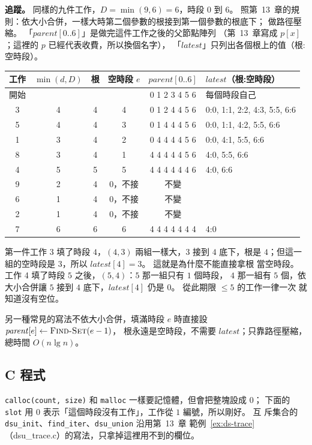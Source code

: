 \textbf{追蹤。} 同樣的九件工作，$D = \min(9, 6) = 6$，時段 $0$ 到 $6$。 
照第~13~章的規則：依大小合併，一樣大時第二個參數的根接到第一個參數的根底下；
 做路徑壓縮。 「$\mathit{parent}[0..6]$」是做完這件工作之後的父節點陣列
（第~13~章寫成 $p[x]$；這裡的 $p$ 已經代表收費，所以換個名字），
「$\mathit{latest}$」只列出各個根上的值（根:空時段）。

\begin{center}
\small
\begin{tabular}{cccccl}
\toprule
工作 & $\min(d, D)$ & 根 & 空時段 $e$ & $\mathit{parent}[0..6]$ & $\mathit{latest}$（根:空時段） \\
\midrule
開始 & & & & 0 1 2 3 4 5 6 & 每個時段自己 \\
3 & 4 & 4 & 4 & 0 1 2 4 4 5 6 & 0:0, 1:1, 2:2, 4:3, 5:5, 6:6 \\
5 & 4 & 4 & 3 & 0 1 4 4 4 5 6 & 0:0, 1:1, 4:2, 5:5, 6:6 \\
1 & 3 & 4 & 2 & 0 4 4 4 4 5 6 & 0:0, 4:1, 5:5, 6:6 \\
8 & 3 & 4 & 1 & 4 4 4 4 4 5 6 & 4:0, 5:5, 6:6 \\
4 & 5 & 5 & 5 & 4 4 4 4 4 4 6 & 4:0, 6:6 \\
9 & 2 & 4 & 0，不接 & 不變 & \\
6 & 1 & 4 & 0，不接 & 不變 & \\
2 & 1 & 4 & 0，不接 & 不變 & \\
7 & 6 & 6 & 6 & 4 4 4 4 4 4 4 & 4:0 \\
\bottomrule
\end{tabular}
\end{center}

第一件工作 3 填了時段 $4$，$(4, 3)$ 兩組一樣大，$3$ 接到 $4$ 底下，根是
$4$；但這一組的空時段是 $3$，所以 $\mathit{latest}[4] = 3$。 這就是為什麼不能直接拿根
當空時段。 工作 4 填了時段 $5$ 之後，$(5, 4)$：$5$ 那一組只有 $1$ 個時段，
$4$ 那一組有 $5$ 個，依大小合併讓 $5$ 接到 $4$ 底下，$\mathit{latest}[4]$ 仍是 $0$。
從此期限 $\le 5$ 的工作一律一次  就知道沒有空位。

另一種常見的寫法不依大小合併，填滿時段 $e$ 時直接設 $\mathit{parent}[e] \gets \proc{Find-Set}(e - 1)$，
根永遠是空時段，不需要 $\mathit{latest}$；只靠路徑壓縮，總時間 $O(n \lg n)$。

\subsection{C 程式}

\begin{cbookrecap}[第~14~章結構、第~19~章 19.3 節]
\texttt{calloc(count, size)} 和 \texttt{malloc} 一樣要記憶體，但會把整塊設成 $0$；
下面的 \texttt{slot} 用 $0$ 表示「這個時段沒有工作」，工作從 $1$ 編號，所以剛好。 互
斥集合的 \texttt{dsu\_init}、\texttt{find\_iter}、\texttt{dsu\_union} 沿用第~13~章
範例~\ref{ex:ds-trace}（dsu\_trace.c）的寫法，只拿掉這裡用不到的欄位。
\end{cbookrecap}

